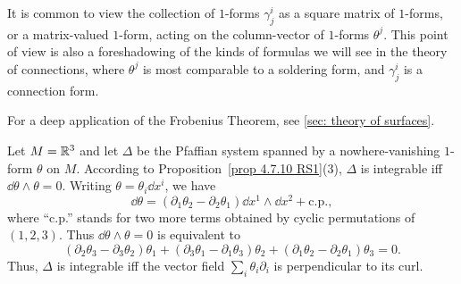 \begin{rem}
    It is common to view the collection of $1$-forms $\gamma^i_j$ as a square matrix of $1$-forms, or a matrix-valued $1$-form, acting on the column-vector of $1$-forms $\theta^j$. This point of view is also a foreshadowing of the kinds of formulas we will see in the theory of connections, where $\theta^j$ is most comparable to a soldering form, and $\gamma^i_j$ is a connection form.
\end{rem}

For a deep application of the Frobenius Theorem, see \subsect \ref{sec: theory of surfaces}.

\begin{example}
    Let $M=\mathbb{R}^3$ and let $\Delta$ be the Pfaffian system spanned by a nowhere-vanishing $1$-form $\theta$ on $M$. According to Proposition~\ref{prop 4.7.10 RS1}(3), $\Delta$ is integrable iff $\dd\theta\wedge\theta=0$. Writing $\theta=\theta_i\dd x^i$, we have
    \[\dd\theta=(\partial_1\theta_2-\partial_2\theta_1)\dd x^1\wedge\dd x^2+\mathrm{c.p.},\]
    where ``c.p.'' stands for two more terms obtained by cyclic permutations of $(1,2,3)$. Thus $\dd\theta\wedge\theta=0$ is equivalent to
    \[(\partial_2\theta_3-\partial_3\theta_2)\theta_1+(\partial_3\theta_1-\partial_1\theta_3)\theta_2+(\partial_1\theta_2-\partial_2\theta_1)\theta_3=0.\]
    Thus, $\Delta$ is integrable iff the vector field $\sum_i \theta_i\partial_i$ is perpendicular to its curl.
\end{example}



